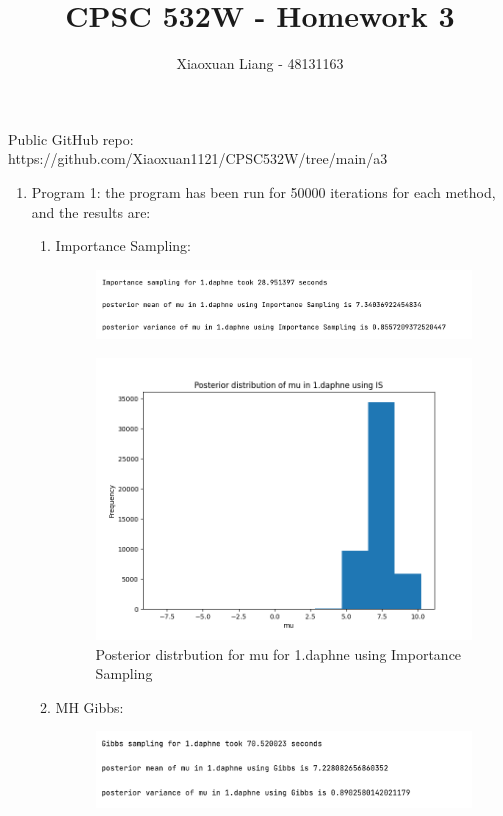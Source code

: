 \documentclass{article}
\title{ \normalfont \normalsize 
\huge CPSC 532W - Homework 3}
\date{}
\author{Xiaoxuan Liang - 48131163}
\begin{document}
\maketitle

Public GitHub repo: https://github.com/Xiaoxuan1121/CPSC532W/tree/main/a3
\begin{enumerate}
\item Program 1: the program has been run for 50000 iterations for each method,  and the results are:
\begin{enumerate}
\item Importance Sampling:

\begin{figure}[!ht]
	\centering
	\includegraphics[scale=0.6]{../figs/IS/1_program_results}
\end{figure}

\begin{figure}[!ht]
	\centering
	\includegraphics[scale=0.6]{../figs/IS/posterior_histogram_1_daphne}
	\caption{Posterior distrbution for mu for 1.daphne using Importance Sampling}
\end{figure}

\newpage
\item MH Gibbs:

\begin{figure}[!ht]
	\centering
	\includegraphics[scale=0.5]{../figs/Gibbs/1_program_results}
\end{figure}


\end{enumerate}
\end{enumerate}
\end{document}
